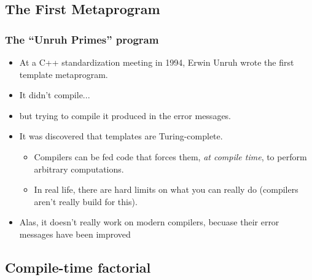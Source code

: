 \subsection{The First Metaprogram}
\begin{frame}[fragile,t]
\frametitle{The ``Unruh Primes'' program}
\begin{itemize}[<+->]
\item At a C++ standardization meeting in 1994, Erwin Unruh wrote the
  first template metaprogram.
\item It didn't compile...
\item but trying to compile it produced 
  in the error messages.
\item It was discovered that templates are Turing-complete.
  \begin{itemize}
  \item Compilers can be fed code that forces them, \emph{at compile
    time}, to perform arbitrary computations.
  \item In real life, there are hard limits on what you can really
    do (compilers aren't really build for this).
    \end{itemize}
\item Alas, it doesn't really work on modern compilers, becuase their
  error messages have been improved
\end{itemize}

\end{frame}


\subsection{Compile-time factorial}

